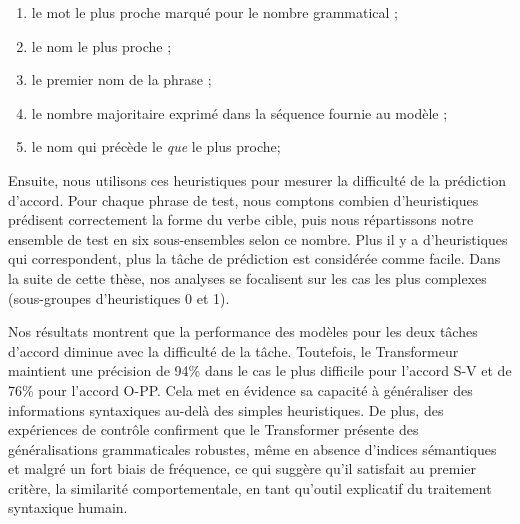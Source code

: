 \vspace{-0.8\baselineskip}
\begin{enumerate}[label=h\arabic*.]
\item le mot le plus proche marqué pour le nombre grammatical ;
\vspace{-0.5\baselineskip}
\item le nom le plus proche ;
\vspace{-0.5\baselineskip}
\item le premier nom de la phrase ;
\vspace{-0.5\baselineskip}
\item le nombre majoritaire exprimé dans la séquence fournie au modèle ;
\vspace{-0.5\baselineskip}
\item le nom qui précède le \emph{que} le plus proche;
\vspace{-0.5\baselineskip}
\end{enumerate}
\vspace{-0.5\baselineskip}

\noindent Ensuite, nous utilisons ces heuristiques pour mesurer la difficulté de la prédiction d'accord. Pour chaque phrase de test, nous comptons combien d'heuristiques prédisent correctement la forme du verbe cible, puis nous répartissons notre ensemble de test en six sous-ensembles selon ce nombre. Plus il y a d'heuristiques qui correspondent, plus la tâche de prédiction est considérée comme facile. Dans la suite de cette thèse, nos analyses se focalisent sur les cas les plus complexes (sous-groupes d'heuristiques 0 et 1).


Nos résultats montrent que la performance des modèles pour les deux tâches d'accord diminue avec la difficulté de la tâche. Toutefois, le Transformeur maintient une précision de 94\% dans le cas le plus difficile pour l'accord S-V et de 76\% pour l'accord O-PP. Cela met en évidence sa capacité à généraliser des informations syntaxiques au-delà des simples heuristiques. De plus, des expériences de contrôle confirment que le Transformer présente des généralisations grammaticales robustes, même en absence d’indices sémantiques et malgré un fort biais de fréquence, ce qui suggère qu'il satisfait au premier critère, la similarité comportementale, en tant qu'outil explicatif du traitement syntaxique humain.

\vspace{-0.5\baselineskip}

